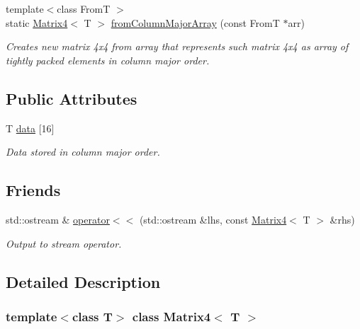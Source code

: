 \begin{DoxyCompactItemize}
{\footnotesize template$<$class FromT $>$ }\\static \hyperlink{class_matrix4}{Matrix4}$<$ T $>$ \hyperlink{class_matrix4_a1c9e68efd1cd024385403a57fcacf513}{fromColumnMajorArray} (const FromT $\ast$arr)
\begin{DoxyCompactList}\small\item\em Creates new matrix 4x4 from array that represents such matrix 4x4 as array of tightly packed elements in column major order. \item\end{DoxyCompactList}\end{DoxyCompactItemize}
\subsection*{Public Attributes}
\begin{DoxyCompactItemize}
\item 
T \hyperlink{class_matrix4_a8941190ba31803101cdfd94ff89f2a66}{data} \mbox{[}16\mbox{]}
\begin{DoxyCompactList}\small\item\em Data stored in column major order. \item\end{DoxyCompactList}\end{DoxyCompactItemize}
\subsection*{Friends}
\begin{DoxyCompactItemize}
\item 
std::ostream \& \hyperlink{class_matrix4_a0c80b0aa66b23ac6ad3bdcf81a0ada10}{operator$<$$<$} (std::ostream \&lhs, const \hyperlink{class_matrix4}{Matrix4}$<$ T $>$ \&rhs)
\begin{DoxyCompactList}\small\item\em Output to stream operator. \item\end{DoxyCompactList}\end{DoxyCompactItemize}


\subsection{Detailed Description}
\subsubsection*{template$<$class T$>$ class Matrix4$<$ T $>$}


